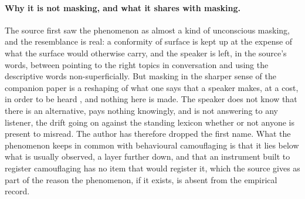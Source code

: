 \paragraph{Why it is not masking, and what it shares with masking.} The source first saw the phenomenon as almost a kind of unconscious masking, and the resemblance is real: a conformity of surface is kept up at the expense of what the surface would otherwise carry, and the speaker is left, in the source's words, between pointing to the right topics in conversation and using the descriptive words non-superficially. But masking in the sharper sense of the companion paper is a reshaping of what one says that a speaker makes, at a cost, in order to be heard \cite{Unconveyable}, and nothing here is made. The speaker does not know that there is an alternative, pays nothing knowingly, and is not answering to any listener, the drift going on against the standing lexicon whether or not anyone is present to misread. The author has therefore dropped the first name. What the phenomenon keeps in common with behavioural camouflaging \cite{Hull2017, Hull2019, Pearson2021} is that it lies below what is usually observed, a layer further down, and that an instrument built to register camouflaging has no item that would register it, which the source gives as part of the reason the phenomenon, if it exists, is absent from the empirical record.

